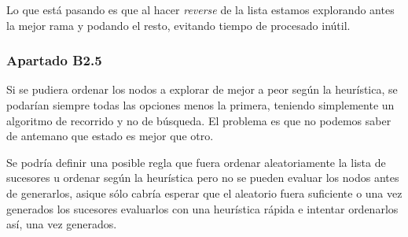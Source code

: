 \documentclass[nochap]{apuntes}
\begin{document}
Lo que está pasando es que al hacer \textit{reverse} de la lista estamos explorando antes la mejor rama y podando el resto, evitando tiempo de procesado inútil.

\subsubsection*{Apartado B2.5}
Si se pudiera ordenar los nodos a explorar de mejor a peor según la heurística, se podarían siempre todas las opciones menos la primera, teniendo simplemente un algoritmo de recorrido y no de búsqueda. El problema es que no podemos saber de antemano que estado es mejor que otro.

Se podría definir una posible regla que fuera ordenar aleatoriamente la lista de sucesores u ordenar según la heurística pero no se pueden evaluar los nodos antes de generarlos, asique sólo cabría esperar que el aleatorio fuera suficiente o una vez generados los sucesores evaluarlos con una heurística rápida e intentar ordenarlos así, una vez generados.
\end{document}
